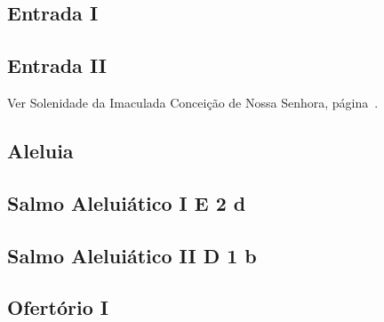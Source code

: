 \def\Prefix{communia/commune-sanctarum}

\subsection{Entrada I}\label{subsection:communia/commune-sanctarum/introitus-1}

\AllowPageFlush

\subsection{Entrada II}\label{subsection:communia/commune-sanctarum/introitus-2}

\begin{rubrica}
  Ver Solenidade da Imaculada Conceição de Nossa Senhora, página~\pageref{subsection:proprium-sanctorum/in-conceptione-immaculata-bmv/psalmus-responsorius}.
\end{rubrica}

\subsection{Aleluia}\label{subsection:communia/commune-sanctarum/alleluia}

\AllowPageFlush

\subsection[Salmo Aleluiático I]{Salmo Aleluiático I \textmd{E 2 d}}\label{subsection:communia/commune-sanctarum/psalmus-alleluiaticus-1}

\AllowPageFlush

\subsection[Salmo Aleluiático I]{Salmo Aleluiático II \textmd{D 1 b}}\label{subsection:communia/commune-sanctarum/psalmus-alleluiaticus-2}

\AllowPageFlush

\subsection{Ofertório I}\label{subsection:communia/commune-sanctarum/offertorium-1}

